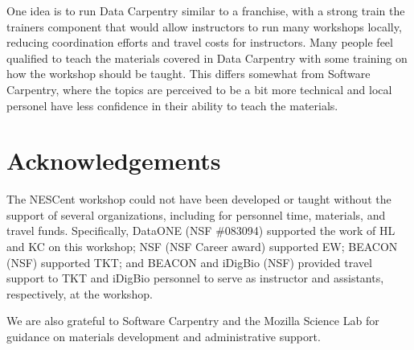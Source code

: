 \documentclass[11pt]{article}
\begin{document}
One idea is to run Data Carpentry similar to a franchise, with a strong train the 
trainers component that would allow instructors to run many workshops locally, 
reducing coordination efforts and travel costs for instructors. Many people feel 
qualified to teach the materials covered in Data Carpentry with some training on 
how the workshop should be taught. This differs somewhat from Software Carpentry, where
the topics are perceived to be a bit more technical and local personel have less 
confidence in their ability to teach the materials.

\section{Acknowledgements}

The NESCent workshop could not have been developed or taught without the support of several organizations, including for personnel time, materials, and travel funds. Specifically, DataONE (NSF \#083094) supported the work of HL and KC on this workshop; NSF (NSF Career award) supported EW; BEACON (NSF) supported TKT; and BEACON and iDigBio (NSF) provided travel support to TKT and iDigBio personnel to serve as instructor and assistants, respectively, at the workshop.

We are also grateful to Software Carpentry and the Mozilla Science Lab for guidance on materials development and administrative support.
\end{document}
